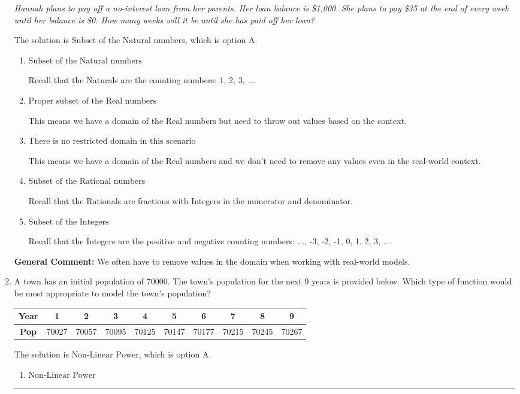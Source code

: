 \documentclass{extbook}[14pt]
\newcommand{\litem}[1]{\item #1

\rule{\textwidth}{0.4pt}}
\begin{document}
\begin{enumerate}
{\begin{center}
    \textit{ Hannah plans to pay off a no-interest loan from her parents. Her loan balance is \$1,000. She plans to pay \$35 at the end of every week until her balance is \$0. How many weeks will it be until she has paid off her loan? }
\end{center}
The solution is \( \text{Subset of the Natural numbers} \), which is option A.\begin{enumerate}[label=\Alph*.]
\item \( \text{Subset of the Natural numbers} \)

Recall that the Naturals are the counting numbers: 1, 2, 3, ...
\item \( \text{Proper subset of the Real numbers} \)

This means we have a domain of the Real numbers but need to throw out values based on the context.
\item \( \text{There is no restricted domain in this scenario} \)

This means we have a domain of the Real numbers and we don't need to remove any values even in the real-world context.
\item \( \text{Subset of the Rational numbers} \)

Recall that the Rationals are fractions with Integers in the numerator and denominator.
\item \( \text{Subset of the Integers} \)

Recall that the Integers are the positive and negative counting numbers: ..., -3, -2, -1, 0, 1, 2, 3, ... 
\end{enumerate}

\textbf{General Comment:} We often have to remove values in the domain when working with real-world models.
}
\litem{
A town has an initial population of 70000. The town's population for the next 9 years is provided below. Which type of function would be most appropriate to model the town's population?


\begin{tabular}{c|c|c|c|c|c|c|c|c|c}
\textbf{Year} &1 &2 &3 &4 &5 &6 &7 &8 &9\tabularnewline \hline
\textbf{Pop} &70027 &70057 &70095 &70125 &70147 &70177 &70215 &70245 &70267\end{tabular}The solution is \( \text{Non-Linear Power} \), which is option A.\begin{enumerate}[label=\Alph*.]
\item \( \text{Non-Linear Power} \)


\end{enumerate}}
\end{enumerate}
\end{document}
